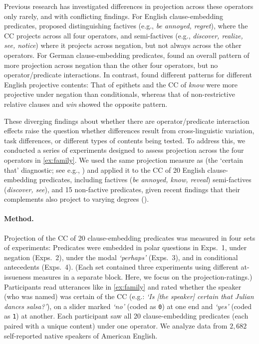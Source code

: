 \documentclass[11pt, a4paper]{article}
\begin{document}
	\noindent
	Previous research has investigated differences in projection across these operators only rarely, and with conflicting findings.
	For English clause-embedding predicates, \citet{karttunen_observations_1971} proposed distinguishing factives (e.g., \emph{be annoyed, regret}), where the CC projects across all four operators, and semi-factives (e.g., \emph{discover, realize, see, notice}) where it projects across negation, but not always across the other operators.
	For German clause-embedding predicates,
	\cite{sieker_projective_2022} found an overall pattern of more projection across negation than the other four operators, but no operator/predicate interactions.
	In contrast, \citet{smith_relationship_2014} found different patterns for different English projective contents: That of epithets and the CC of \emph{know} were more projective under negation than conditionals, whereas that of non-restrictive relative clauses and \emph{win} showed the opposite pattern.

	These diverging findings about whether there are operator/predicate interaction effects raise the question whether differences result from cross-linguistic variation, task differences, or different types of contents being tested. To address this, we conducted a series of experiments designed to assess projection across the four operators in \ref{ex:family}. We used the same projection measure as \citet{sieker_projective_2022} (the `certain that' diagnostic; see e.g., \citealp{tonhauser_how_2018,djarv_prosodic_2017,mahler_social_2020}) and applied it to the CC of 20 English clause-embedding predicates, including factives (\emph{be annoyed, know, reveal}) semi-factives (\emph{discover, see}),
	and 15 non-factive predicates, given recent findings that their complements also project to varying degrees (\citealt{degen_are_2022}).

\paragraph{Method.}
	Projection of the CC of 20 clause-embedding predicates was measured in four sets of experiments: Predicates were embedded in polar questions in Exps.\ 1, under negation (Exps.\ 2), under the modal {\em \lq perhaps\rq} (Exps.\ 3), and in conditional antecedents (Exps.\ 4). (Each set contained three experiments using different at-issueness measures in a separate block. Here, we focus on the projection-ratings.)
	Participants read utterances like in \ref{ex:family} and rated whether the speaker (who was named) was certain of the CC (e.g.: \emph{\lq Is [the speaker] certain that Julian dances salsa?\rq}), on a slider marked \emph{`no'} (coded as \texttt{0}) at one end and \emph{`yes'} (coded as \texttt{1}) at another. Each participant saw all 20 clause-embedding predicates (each paired with a unique content) under one operator. We analyze data from $2,682$ self-reported native speakers of American English.
\end{document}
